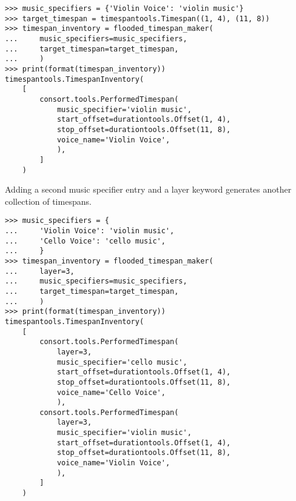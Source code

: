 \begin{singlespacing}
\vspace{-0.5\baselineskip}
\begin{lstlisting}
>>> music_specifiers = {'Violin Voice': 'violin music'}
>>> target_timespan = timespantools.Timespan((1, 4), (11, 8))
>>> timespan_inventory = flooded_timespan_maker(
...     music_specifiers=music_specifiers,
...     target_timespan=target_timespan,
...     )
>>> print(format(timespan_inventory))
timespantools.TimespanInventory(
    [
        consort.tools.PerformedTimespan(
            music_specifier='violin music',
            start_offset=durationtools.Offset(1, 4),
            stop_offset=durationtools.Offset(11, 8),
            voice_name='Violin Voice',
            ),
        ]
    )
\end{lstlisting}
\end{singlespacing}

Adding a second music specifier entry and a layer keyword generates another
collection of timespans.

\begin{comment}
<abjad>
music_specifiers = {
    'Violin Voice': 'violin music',
    'Cello Voice': 'cello music',
    }
timespan_inventory = flooded_timespan_maker(
    layer=3,
    music_specifiers=music_specifiers,
    target_timespan=target_timespan,
    )
print(format(timespan_inventory))
</abjad>
\end{comment}

\begin{singlespacing}
\vspace{-0.5\baselineskip}
\begin{lstlisting}
>>> music_specifiers = {
...     'Violin Voice': 'violin music',
...     'Cello Voice': 'cello music',
...     }
>>> timespan_inventory = flooded_timespan_maker(
...     layer=3,
...     music_specifiers=music_specifiers,
...     target_timespan=target_timespan,
...     )
>>> print(format(timespan_inventory))
timespantools.TimespanInventory(
    [
        consort.tools.PerformedTimespan(
            layer=3,
            music_specifier='cello music',
            start_offset=durationtools.Offset(1, 4),
            stop_offset=durationtools.Offset(11, 8),
            voice_name='Cello Voice',
            ),
        consort.tools.PerformedTimespan(
            layer=3,
            music_specifier='violin music',
            start_offset=durationtools.Offset(1, 4),
            stop_offset=durationtools.Offset(11, 8),
            voice_name='Violin Voice',
            ),
        ]
    )
\end{lstlisting}
\end{singlespacing}

